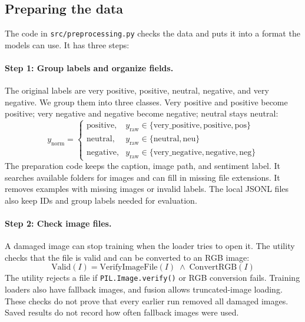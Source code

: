 \documentclass[11pt,a4paper]{article}
\begin{document}
\subsection{Preparing the data}
\label{subsec:preprocessing}
The code in \texttt{src/preprocessing.py} checks the data and puts it into a format the models can use. It has three steps:

\paragraph{Step 1: Group labels and organize fields.}
The original labels are very positive, positive, neutral, negative, and very negative. We group them into three classes. Very positive and positive become positive; very negative and negative become negative; neutral stays neutral:
\begin{equation}
    y_{\text{norm}} = 
    \begin{cases} 
      \text{positive}, & y_{\text{raw}} \in \{\text{very\_positive}, \text{positive}, \text{pos}\} \\
      \text{neutral},  & y_{\text{raw}} \in \{\text{neutral}, \text{neu}\} \\
      \text{negative}, & y_{\text{raw}} \in \{\text{very\_negative}, \text{negative}, \text{neg}\} 
    \end{cases}
\end{equation}
The preparation code keeps the caption, image path, and sentiment label. It searches available folders for images and can fill in missing file extensions. It removes examples with missing images or invalid labels. The local JSONL files also keep IDs and group labels needed for evaluation.

\paragraph{Step 2: Check image files.}
A damaged image can stop training when the loader tries to open it. The utility checks that the file is valid and can be converted to an RGB image:
\begin{equation}
    \mathrm{Valid}(I) = \mathrm{VerifyImageFile}(I) \;\land\; \mathrm{ConvertRGB}(I)
\end{equation}
The utility rejects a file if \texttt{PIL.Image.verify()} or RGB conversion fails. Training loaders also have fallback images, and fusion allows truncated-image loading. These checks do not prove that every earlier run removed all damaged images. Saved results do not record how often fallback images were used.
\end{document}

